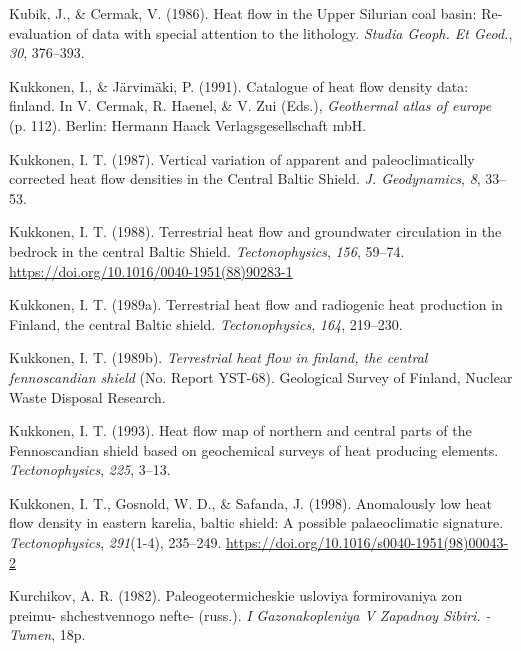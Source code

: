 \documentclass[draft,linenumbers]{agujournal2018}
\begin{document}
\leavevmode{}%
Kubik, J., \& Cermak, V. (1986). Heat flow in the {Upper Silurian} coal
basin: Re-evaluation of data with special attention to the lithology.
\emph{Studia Geoph. Et Geod.}, \emph{30}, 376--393.

\leavevmode{}%
Kukkonen, I., \& Järvimäki, P. (1991). Catalogue of heat flow density
data: finland. In V. Cermak, R. Haenel, \& V. Zui (Eds.),
\emph{Geothermal atlas of europe} (p. 112). Berlin: Hermann Haack
Verlagsgesellschaft mbH.

\leavevmode{}%
Kukkonen, I. T. (1987). Vertical variation of apparent and
paleoclimatically corrected heat flow densities in the {Central Baltic
Shield}. \emph{J. Geodynamics}, \emph{8}, 33--53.

\leavevmode{}%
Kukkonen, I. T. (1988). Terrestrial heat flow and groundwater
circulation in the bedrock in the central {Baltic Shield}.
\emph{Tectonophysics}, \emph{156}, 59--74.
\url{https://doi.org/10.1016/0040-1951(88)90283-1}

\leavevmode{}%
Kukkonen, I. T. (1989a). Terrestrial heat flow and radiogenic heat
production in {Finland}, the central {Baltic} shield.
\emph{Tectonophysics}, \emph{164}, 219--230.

\leavevmode{}%
Kukkonen, I. T. (1989b). \emph{Terrestrial heat flow in finland, the
central fennoscandian shield} (No. Report YST-68). Geological Survey of
Finland, Nuclear Waste Disposal Research.

\leavevmode{}%
Kukkonen, I. T. (1993). Heat flow map of northern and central parts of
the {Fennoscandian} shield based on geochemical surveys of heat
producing elements. \emph{Tectonophysics}, \emph{225}, 3--13.

\leavevmode{}%
Kukkonen, I. T., Gosnold, W. D., \& Safanda, J. (1998). Anomalously low
heat flow density in eastern karelia, baltic shield: A possible
palaeoclimatic signature. \emph{Tectonophysics}, \emph{291}(1-4),
235--249. \url{https://doi.org/10.1016/s0040-1951(98)00043-2}

\leavevmode{}%
Kurchikov, A. R. (1982). Paleogeotermicheskie usloviya formirovaniya zon
preimu- shchestvennogo nefte- (russ.). \emph{I Gazonakopleniya V
Zapadnoy Sibiri. - Tumen}, 18p.
\end{document}
